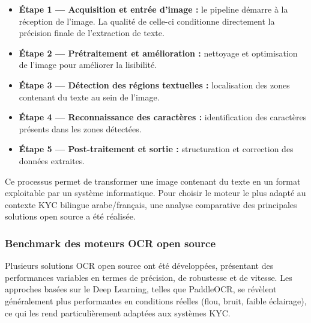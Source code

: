 \begin{itemize}
  \item \textbf{Étape 1 --- Acquisition et entrée d'image :} le pipeline démarre à la réception de l'image. La qualité de celle-ci conditionne directement la précision finale de l'extraction de texte.

  \item \textbf{Étape 2 --- Prétraitement et amélioration :} nettoyage et optimisation de l'image pour améliorer la lisibilité.

  \item \textbf{Étape 3 --- Détection des régions textuelles :} localisation des zones contenant du texte au sein de l'image.

  \item \textbf{Étape 4 --- Reconnaissance des caractères :} identification des caractères présents dans les zones détectées.

  \item \textbf{Étape 5 --- Post-traitement et sortie :} structuration et correction des données extraites.
\end{itemize}

Ce processus permet de transformer une image contenant du texte en un format exploitable par un système informatique. Pour choisir le moteur le plus adapté au contexte KYC bilingue arabe/français, une analyse comparative des principales solutions open source a été réalisée.

\subsubsection{Benchmark des moteurs OCR open source}

Plusieurs solutions OCR open source ont été développées, présentant des performances variables en termes de précision, de robustesse et de vitesse. Les approches basées sur le Deep Learning, telles que PaddleOCR, se révèlent généralement plus performantes en conditions réelles (flou, bruit, faible éclairage), ce qui les rend particulièrement adaptées aux systèmes KYC.


